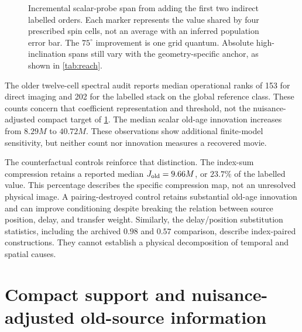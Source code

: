 \begin{figure}[htbp]
\centering
{}
\caption{Incremental scalar-probe span from adding the first two indirect labelled orders. Each marker represents the value shared by four prescribed spin cells, not an average with an inferred population error bar. The $75^\circ$ improvement is one grid quantum. Absolute high-inclination spans still vary with the geometry-specific anchor, as shown in \cref{tab:reach}.}
\label{fig:reach}
\end{figure}

The older twelve-cell spectral audit reports median operational ranks of 153 for direct imaging and 202 for the labelled stack on the global reference class. These counts concern that coefficient representation and threshold, not the nuisance-adjusted compact target of \cref{sec:r2}. The median scalar old-age innovation increases from $8.29M$ to $40.72M$. These observations show additional finite-model sensitivity, but neither count nor innovation measures a recovered movie.

The counterfactual controls reinforce that distinction. The index-sum compression retains a reported median $J_{\rm old}=9.66M$, or $23.7\%$ of the labelled value. This percentage describes the specific compression map, not an unresolved physical image. A pairing-destroyed control retains substantial old-age innovation and can improve conditioning despite breaking the relation between source position, delay, and transfer weight. Similarly, the delay/position substitution statistics, including the archived $0.98$ and $0.57$ comparison, describe index-paired constructions. They cannot establish a physical decomposition of temporal and spatial causes.

\section{Compact support and nuisance-adjusted old-source information}\label{sec:r2}
